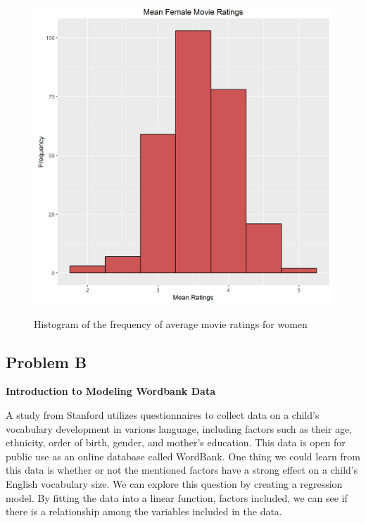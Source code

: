 \documentclass[11pt]{article}  %
\begin{document}
\begin{enumerate}
    \begin{figure}[h]
    \centering
    \caption{Histogram of the frequency of average movie ratings for women}
    \includegraphics[scale=.50]{femaleHistogram}
    \label{fig:femalehist}
    \end{figure}
\end{enumerate}

\newpage
{}
\newpage
\begin{center}
\section*{Problem B}
\end{center}

\textbf{Introduction to Modeling Wordbank Data}

\indent A study from Stanford utilizes questionnaires to collect data on a child's vocabulary development in various language, including factors such as their age, ethnicity, order of birth, gender, and mother's education. This data is open for public use as an online database called WordBank. One thing we could learn from this data is whether or not the mentioned factors have a strong effect on a child's English vocabulary size. We can explore this question by creating a regression model. By fitting the data into a linear function, factors included, we can see if there is a relationship among the variables included in the data.
\end{document}
